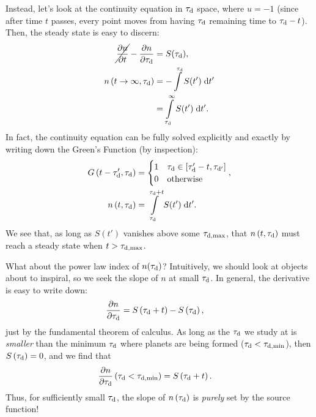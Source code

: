 \documentclass[12pt]{article}
\newcommand*{\pd}[2]{\frac{\partial#1}{\partial#2}}
\newcommand*{\p}[1]{\left(#1\right)}
\newcommand*{\s}[1]{\left[#1\right]}
\begin{document}
Instead, let's look at the continuity equation in $\tau_{\rm d}$ space, where
$u = -1$ (since after time $t$ passes, every point moves from having $\tau_{\rm
d}$ remaining time to $\tau_{\rm d} - t$).
Then, the steady state is easy to discern:
\begin{align}
    \cancel{\pd{n}{t}} - \pd{n}{\tau_{\rm d}}
        &= S(\tau_{\rm d}),\\
    n\p{t \to \infty, \tau_{\rm d}}
        &=
            -\int\limits^{\tau_{\rm d}} S(t')
                \;\mathrm{d}t'\nonumber\\
        &=
            \int\limits_{\tau_{\rm d}}^\infty S(t')
                \;\mathrm{d}t'.\label{eq:taud_steady}
\end{align}
In fact, the continuity equation can be fully solved explicitly and exactly by
writing down the Green's Function (by inspection):
\begin{align}
    G\p{t - \tau_{\rm d}', \tau_{\rm d}}
        &=
            \begin{cases}
                1 & \tau_{\rm d} \in \s{\tau_{\rm d}' - t, \tau_{\rm d'}}\\
                0 & \mathrm{otherwise}
            \end{cases},\\
    n\p{t, \tau_{\rm d}}
        &=
            \int\limits_{\tau_{\rm d}}^{\tau_{\rm d} + t}
                S(t')\;\mathrm{d}t'.
\end{align}
We see that, as long as $S(t')$ vanishes above some $\tau_{\rm d, \max}$, that
$n\p{t, \tau_{\rm d}}$ must reach a steady state when $t > \tau_{\rm d, \max}$.

What about the power law index of $n(\tau_{\rm d})$?
Intuitively, we should look at objects about to inspiral, so we seek the slope
of $n$ at small $\tau_{\rm d}$.
In general, the derivative is easy to write down:
\begin{align}
    \pd{n}{\tau_{\rm d}}
        &=
            S\p{\tau_{\rm d} + t} - S\p{\tau_{\rm d}},
\end{align}
just by the fundamental theorem of calculus.
As long as the $\tau_{\rm d}$ we study at is \emph{smaller} than the minimum
$\tau_{\rm d}$ where planets are being formed ($\tau_{\rm d} < \tau_{\rm d,
\min}$), then $S\p{\tau_{\rm d}} = 0$, and we find that
\begin{align}
    \pd{n}{\tau_{\rm d}}\p{\tau_{\rm d} < \tau_{\rm d, \min}}
        &=
            S\p{\tau_{\rm d} + t}.
\end{align}
Thus, for sufficiently small $\tau_{\rm d}$, the slope of $n\p{\tau_{\rm d}}$ is
\emph{purely} set by the source function!
\end{document}
